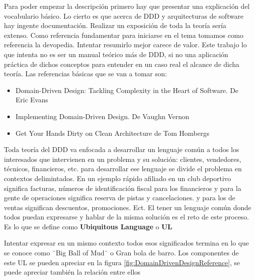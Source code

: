
Para poder empezar la descripción primero hay que presentar una explicación del vocabulario básico. Lo cierto es que acerca de DDD y arquitecturas de software hay ingente documentación. Realizar un exposición de toda la teoría sería extenso. Como referencia fundamentar para iniciarse en el tema tomamos como referencia la devopedia\cite{devopediaDDD}. Intentar resumirlo mejor carece de valor. Este trabajo lo que intenta no es ser un manual teórico más de DDD, si no una aplicación práctica de dichos conceptos para entender en un caso real el alcance de dicha teoría. Las referencias básicas que se van a tomar son:

\begin{itemize}
    \item Domain-Driven Design: Tackling Complexity in the Heart of Software. De Eric Evans\cite{EricEvans2003DDTC}
    \item Implementing Domain-Driven Design. De Vaughn Vernon\cite{VaughnVernon2013IDD}
    \item Get Your Hands Dirty on Clean Architecture de Tom Hombergs \cite{TomHombergs2019GYHD}
\end{itemize}

Toda teoría del DDD va enfocada a desarrollar un lenguaje común a todos los interesados que intervienen en un problema y su solución: clientes, vendedores, técnicos, financieros, etc. para desarrollar ese lenguaje se divide el problema en contextos delimintados. En un ejemplo rápido afiliado en un club deportivo significa facturas, números de identificación fiscal para los financieros y para la gente de operaciones significa reserva de pistas y cancelaciones. y para los de ventas significan descuentos, promociones. Ect. El tener un lenguaje común donde todos puedan expresarse y hablar de la misma solución es el reto de este proceso. Es lo que se define como \textbf{Ubiquitous Language} o \textbf{UL}

Intentar expresar en un mismo contexto todos esos significados termina en lo que se conoce como ¨Big Ball of Mud¨ o Gran bola de barro. Los componentes de este UL se pueden apreciar en la figura  \ref{fig:DomainDrivenDesignReference}, se puede apreciar también la relación entre ellos

